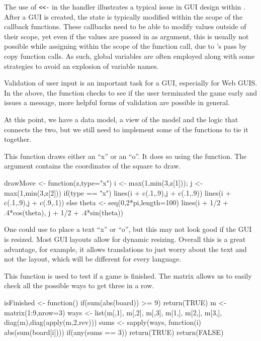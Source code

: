 The use of \verb+<<-+ in the handler illustrates a typical issue in
GUI design within \R. After a GUI is created, the state is
typically modified within the scope of the callback functions. These
callbacks need to be able to modify values outside of their scope, yet
even if the values are passed in as argument, this is usually not
possible while assigning within the scope of the function call, due to
\R's pass by copy function calls. As such, global variables are often
employed along with some strategies to avoid an explosion of variable
names.

Validation of user input is an important task for a GUI, especially
for Web GUIS. In the above,
the  function checks to see if the user
terminated the game early and issues a message, more helpful forms of
validation are possible in general.

At this point, we have a data model, a view of the model and the
logic that connects the two, but we still need to implement some of the
functions to tie it together.


This function draws either an ``x'' or an ``o''. It does so using the
 function. The  argument contains the
coordinates of the square to draw.
\begin{Schunk}
\begin{Sinput}
 drawMove <- function(z,type="x") {
   i <- max(1,min(3,z[1])); j <- max(1,min(3,z[2]))
   if(type == "x") {
     lines(i + c(.1,.9),j + c(.1,.9))
     lines(i + c(.1,.9),j + c(.9,.1))
   } else {
     theta <- seq(0,2*pi,length=100)
     lines(i + 1/2 + .4*cos(theta), j + 1/2 + .4*sin(theta))
   }
 }
\end{Sinput}
\end{Schunk}

One could use  to place a text ``x'' or ``o'', but this may
not look good if the GUI is resized. Most GUI layouts allow for
dynamic resizing. Overall this is a great advantage, for example, it
allows translations to just worry about the text and not the layout,
which will be different for every language.

This function is used to test if a game is finished. The matrix
 allows us to easily check all the possible ways to get three
in a row.
\begin{Schunk}
\begin{Sinput}
 isFinished <- function() {
   if(sum(abs(board)) >= 9) 
     return(TRUE)
   m <- matrix(1:9,nrow=3)
   ways <- list(m[,1], m[,2], m[,3],
                m[1,], m[2,], m[3,],
                diag(m),diag(apply(m,2,rev)))
   sums <- sapply(ways, function(i) abs(sum(board[i])))
   if(any(sums == 3)) 
     return(TRUE)
   return(FALSE)
 }
\end{Sinput}
\end{Schunk}

